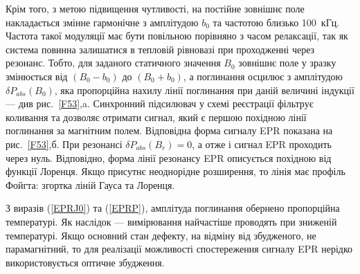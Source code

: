 \documentclass[10pt,a5paper,titlepage,oneside]{book}
\numberwithin{equation}{part}
\begin{document}
Крім того, з метою підвищення чутливості,
на постійне зовнішнє поле накладається змінне гармонічне з амплітудою $b_0$ та частотою близько 100~кГц.
Частота такої модуляції має бути повільною порівняно з часом релаксації,
так як система повинна залишатися в тепловій рівновазі при проходженні через резонанс.
Тобто, для заданого статичного значення $B_0$ зовнішнє поле у зразку змінюється
від $(B_0-b_0)$ до $(B_0+b_0)$,
а поглинання осцилює з амплітудою $\delta P_{abs}(B_0)$, яка
пропорційна нахилу лінії поглинання при даній величині індукції --- див рис.~\ref{F53},a.
Синхронний підсилювач у схемі реєстрації фільтрує
коливання та дозволяє отримати сигнал,
який є першою похідною лінії поглинання за магнітним полем.
Відповідна форма сигналу EPR показана на рис.~\ref{F53},б.
При резонансі $\delta P_{abs}(B_r)=0$, а отже і сигнал EPR проходить через нуль.
Відповідно, форма лінії резонансу EPR описується похідною від функції Лоренця.
Якщо присутнє неоднорідне розширення, то
лінія має профіль Фойгта: згортка ліній Гауса та Лоренця.

З виразів (\ref{EPRJ0}) та (\ref{EPRP}), амплітуда поглинання
обернено пропорційна температурі.
Як наслідок --- вимірювання найчастіше проводять при зниженій температурі.
Якщо основний стан дефекту, на відміну від збудженого, не парамагнітний,
то для реалізації можливості спостереження сигналу EPR нерідко використовується оптичне збудження.
\end{document}
